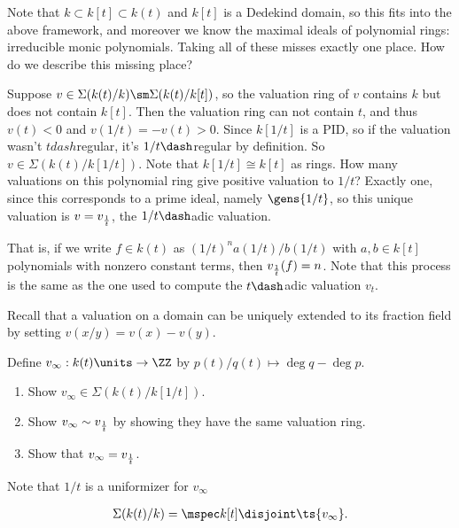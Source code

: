 Note that \(k \subset k[t] \subset k(t)\) and \(k[t]\) is a Dedekind
domain, so this fits into the above framework, and moreover we know the
maximal ideals of polynomial rings: irreducible monic polynomials.
Taking all of these misses exactly one place. How do we describe this
missing place?

Suppose \(v \in \Sigma(k(t) / k) \sm \Sigma(k(t) / k[t])\), so the
valuation ring of \(v\) contains \(k\) but does not contain \(k[t]\).
Then the valuation ring can not contain \(t\), and thus \(v(t) < 0\) and
\(v(1/t) = -v(t) > 0\). Since \(k[1/t]\) is a PID, so if the valuation
wasn't \(t dash\)regular, it's \(1/t\dash\)regular by definition. So
\(v\in \Sigma(k(t) / k[1/t])\). Note that \(k[1/t] \cong k[t]\) as
rings. How many valuations on this polynomial ring give positive
valuation to \(1/t\)? Exactly one, since this corresponds to a prime
ideal, namely \(\gens{1/t}\), so this unique valuation is
\(v = v_{1 \over t}\), the \(1/t\dash\)adic valuation.

That is, if we write \(f\in k(t)\) as \((1/t)^n a(1/t)/b(1/t)\) with
\(a, b\in k[t]\) polynomials with nonzero constant terms, then
\(v_{1\over t}(f) = n\). Note that this process is the same as the one
used to compute the \(t\dash\)adic valuation \(v_t\).

Recall that a valuation on a domain can be uniquely extended to its
fraction field by setting \(v(x/y) = v(x) - v(y)\).

\begin{exercise}[?]

Define \(v_\infty: k(t)\units \to \ZZ\) by
\(p(t)/q(t) \mapsto \deg q - \deg p\).

\begin{enumerate}
\def\labelenumi{\alph{enumi}.}
\item
  Show \(v_ \infty \in \Sigma(k(t) / k[1/t])\).
\item
  Show \(v_ \infty \sim v_{1\over t}\) by showing they have the same
  valuation ring.
\item
  Show that \(v_ \infty = v_{1\over t}\).
\end{enumerate}

\end{exercise}

Note that \(1/t\) is a uniformizer for \(v_ \infty\)

\begin{theorem}

\begin{align*}  
\Sigma(k(t) / k) = \mspec k[t] \disjoint \ts{v_ \infty}
.\end{align*}

\end{theorem}

